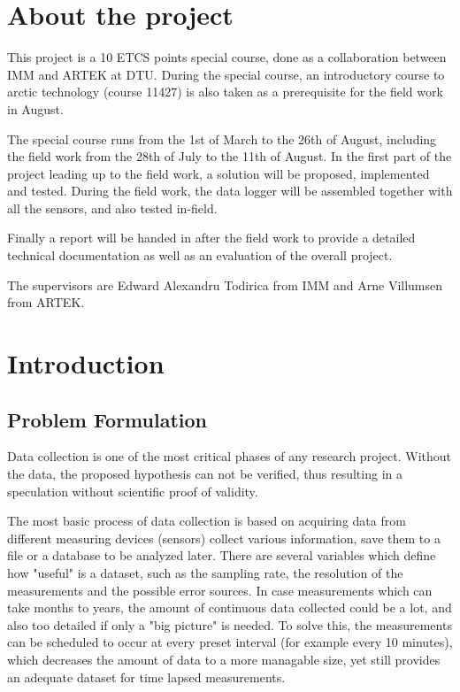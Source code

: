 \documentclass{project}
\begin{document}
\maketitle

\section{About the project}
This project is a 10 ETCS points special course, done as a collaboration between IMM and ARTEK at DTU. During the special course, an introductory course to arctic technology (course 11427) is also taken as a prerequisite for the field work in August. 

The special course runs from the 1st of March to the 26th of August, including the field work from the 28th of July to the 11th of August. 
In the first part of the project leading up to the field work, a solution will be proposed, implemented and tested. 
During the field work, the data logger will be assembled together with all the sensors, and also tested in-field.

Finally a report will be handed in after the field work to provide a detailed technical documentation as well as an evaluation of the overall project.

The supervisors are Edward Alexandru Todirica from IMM and Arne Villumsen from ARTEK. 

\section{Introduction}
\subsection{Problem Formulation}
Data collection is one of the most critical phases of any research project. Without the data, the proposed hypothesis can not be verified, thus resulting in a speculation without scientific proof of validity. 

The most basic process of data collection is based on acquiring data from different measuring devices (sensors) collect various information, save them to a file or a database to be analyzed later. There are several variables which define how "useful" is a dataset, such as the sampling rate, the resolution of the measurements and the possible error sources. In case measurements which can take months to years, the amount of continuous data collected could be a lot, and also too detailed if only a "big picture" is needed. To solve this, the measurements can be scheduled to occur at every preset interval (for example every 10 minutes), which decreases the amount of data to a more managable size, yet still provides an adequate dataset for time lapsed measurements.
\end{document}
